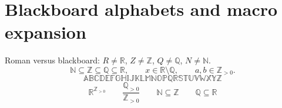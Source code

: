 \documentclass[11pt]{article}
\newcommand{\N}{\mathbb{N}}
\newcommand{\Z}{\mathbb{Z}}
\newcommand{\Q}{\mathbb{Q}}
\newcommand{\R}{\mathbb{R}}
\begin{document}
\pagestyle{empty}
\section*{Blackboard alphabets and macro expansion}
Roman versus blackboard: $R\ne\R$, $Z\ne\Z$, $Q\ne\Q$, $N\ne\N$.
\[
  \N\subseteq\Z\subseteq\Q\subseteq\R,
  \qquad x\in\R\setminus\Q,
  \qquad a,b\in\Z_{>0}.
\]
\[
  \mathbb{ABCDEFGHIJKLMNOPQRSTUVWXYZ}
\]
\[
  \R^{\Z_{>0}} \qquad
  \frac{\Q_{>0}}{\Z_{>0}} \qquad
  {\scriptstyle\N\subseteq\Z}\qquad
  {\scriptscriptstyle\Q\subseteq\R}
\]
\end{document}
